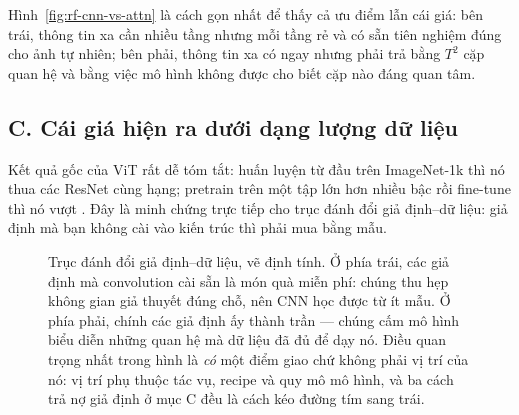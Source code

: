 \documentclass[../../../deep_learning.tex]{subfiles}
\begin{document}
Hình~\ref{fig:rf-cnn-vs-attn} là cách gọn nhất để thấy cả ưu điểm lẫn cái giá: bên trái, thông tin xa cần nhiều tầng nhưng mỗi tầng rẻ và có sẵn tiên nghiệm đúng cho ảnh tự nhiên; bên phải, thông tin xa có ngay nhưng phải trả bằng \(T^2\) cặp quan hệ và bằng việc mô hình không được cho biết cặp nào đáng quan tâm.

\subsection{C. Cái giá hiện ra dưới dạng lượng dữ liệu}
Kết quả gốc của ViT rất dễ tóm tắt: huấn luyện từ đầu trên ImageNet-1k thì nó thua các ResNet cùng hạng; pretrain trên một tập lớn hơn nhiều bậc rồi fine-tune thì nó vượt \cite{dosovitskiy2021vit}. Đây là minh chứng trực tiếp cho trục đánh đổi giả định--dữ liệu: giả định mà bạn không cài vào kiến trúc thì phải mua bằng mẫu.


\begin{figure}[H]\centering
{}
\caption{Trục đánh đổi giả định--dữ liệu, vẽ định tính. Ở phía trái, các giả định mà convolution cài sẵn là món quà miễn phí: chúng thu hẹp không gian giả thuyết đúng chỗ, nên CNN học được từ ít mẫu. Ở phía phải, chính các giả định ấy thành trần --- chúng cấm mô hình biểu diễn những quan hệ mà dữ liệu đã đủ để dạy nó. Điều quan trọng nhất trong hình là \emph{có} một điểm giao chứ không phải vị trí của nó: vị trí phụ thuộc tác vụ, recipe và quy mô mô hình, và ba cách trả nợ giả định ở mục C đều là cách kéo đường tím sang trái.}
\label{fig:du-lieu-cnn-vit}
\end{figure}
\end{document}
